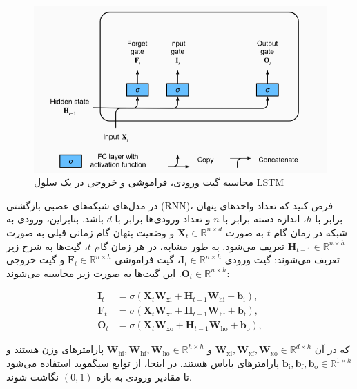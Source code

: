 \begin{figure}
	\centering
	\includegraphics[width=0.7\linewidth]{lstm1}
	\caption{محاسبه گیت ورودی،‌ فراموشی و خروجی در یک سلول LSTM}
	\label{fig:lstm1}
\end{figure}

در مدل‌های شبکه‌های عصبی بازگشتی (RNN)، فرض کنید که تعداد واحدهای پنهان برابر با \( h \)، اندازه دسته برابر با \( n \) و تعداد ورودی‌ها برابر با \( d \) باشد. بنابراین، ورودی به شبکه در زمان گام \( t \) به صورت \( \mathbf{X}_t \in \mathbb{R}^{n \times d} \) و وضعیت پنهان گام زمانی قبلی به صورت \( \mathbf{H}_{t-1} \in \mathbb{R}^{n \times h} \) تعریف می‌شود. به طور مشابه، در هر زمان گام \( t \)، گیت‌ها به شرح زیر تعریف می‌شوند: گیت ورودی \( \mathbf{I}_t \in \mathbb{R}^{n \times h} \)، گیت فراموشی \( \mathbf{F}_t \in \mathbb{R}^{n \times h} \) و گیت خروجی \( \mathbf{O}_t \in \mathbb{R}^{n \times h} \). این گیت‌ها به صورت زیر محاسبه می‌شوند:

\[
\begin{aligned}
	\mathbf{I}_t &= \sigma(\mathbf{X}_t \mathbf{W}_{\textrm{xi}} + \mathbf{H}_{t-1} \mathbf{W}_{\textrm{hi}} + \mathbf{b}_\textrm{i}),\\
	\mathbf{F}_t &= \sigma(\mathbf{X}_t \mathbf{W}_{\textrm{xf}} + \mathbf{H}_{t-1} \mathbf{W}_{\textrm{hf}} + \mathbf{b}_\textrm{f}),\\
	\mathbf{O}_t &= \sigma(\mathbf{X}_t \mathbf{W}_{\textrm{xo}} + \mathbf{H}_{t-1} \mathbf{W}_{\textrm{ho}} + \mathbf{b}_\textrm{o}),
\end{aligned}
\]

که در آن \( \mathbf{W}_{\textrm{xi}}, \mathbf{W}_{\textrm{xf}}, \mathbf{W}_{\textrm{xo}} \in \mathbb{R}^{d \times h} \) و \( \mathbf{W}_{\textrm{hi}}, \mathbf{W}_{\textrm{hf}}, \mathbf{W}_{\textrm{ho}} \in \mathbb{R}^{h \times h} \) پارامترهای وزن هستند و \( \mathbf{b}_\textrm{i}, \mathbf{b}_\textrm{f}, \mathbf{b}_\textrm{o} \in \mathbb{R}^{1 \times h} \) پارامترهای بایاس هستند. در اینجا، از توابع سیگموید استفاده می‌شود تا مقادیر ورودی به بازه \( (0, 1) \) نگاشت شوند.


